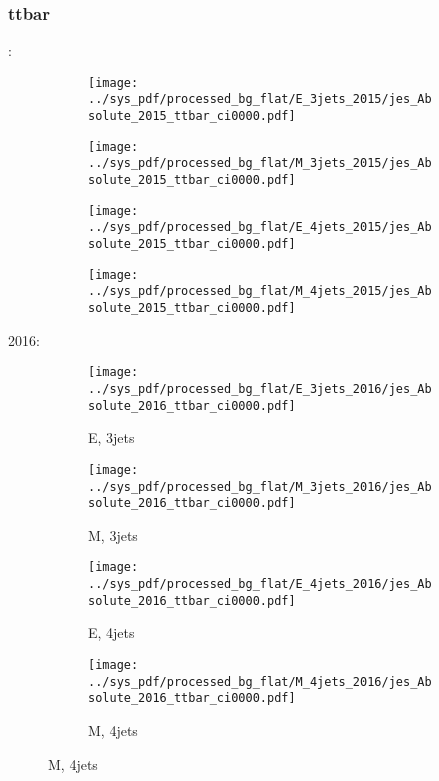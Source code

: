 \documentclass{beamer}
\begin{document}
\begin{frame}
\frametitle{ttbar}
\fontsize{5}{1}:
\begin{figure}
\centering
\begin{subfigure}[b]{0.24\textwidth}
\texttt{[image: ../sys\_pdf/processed\_bg\_flat/E\_3jets\_2015/jes\_Absolute\_2015\_ttbar\_ci0000.pdf]}
\end{subfigure}
\begin{subfigure}[b]{0.24\textwidth}
\texttt{[image: ../sys\_pdf/processed\_bg\_flat/M\_3jets\_2015/jes\_Absolute\_2015\_ttbar\_ci0000.pdf]}
\end{subfigure}
\begin{subfigure}[b]{0.24\textwidth}
\texttt{[image: ../sys\_pdf/processed\_bg\_flat/E\_4jets\_2015/jes\_Absolute\_2015\_ttbar\_ci0000.pdf]}
\end{subfigure}
\begin{subfigure}[b]{0.24\textwidth}
\texttt{[image: ../sys\_pdf/processed\_bg\_flat/M\_4jets\_2015/jes\_Absolute\_2015\_ttbar\_ci0000.pdf]}
\end{subfigure}
\end{figure}
2016:
\begin{figure}
\centering
\begin{subfigure}[b]{0.24\textwidth}
\texttt{[image: ../sys\_pdf/processed\_bg\_flat/E\_3jets\_2016/jes\_Absolute\_2016\_ttbar\_ci0000.pdf]}
\captionsetup{font=tiny}
\caption{E, 3jets}
\end{subfigure}
\begin{subfigure}[b]{0.24\textwidth}
\texttt{[image: ../sys\_pdf/processed\_bg\_flat/M\_3jets\_2016/jes\_Absolute\_2016\_ttbar\_ci0000.pdf]}
\captionsetup{font=tiny}
\caption{M, 3jets}
\end{subfigure}
\begin{subfigure}[b]{0.24\textwidth}
\texttt{[image: ../sys\_pdf/processed\_bg\_flat/E\_4jets\_2016/jes\_Absolute\_2016\_ttbar\_ci0000.pdf]}
\captionsetup{font=tiny}
\caption{E, 4jets}
\end{subfigure}
\begin{subfigure}[b]{0.24\textwidth}
\texttt{[image: ../sys\_pdf/processed\_bg\_flat/M\_4jets\_2016/jes\_Absolute\_2016\_ttbar\_ci0000.pdf]}
\captionsetup{font=tiny}
\caption{M, 4jets}
\end{subfigure}
\end{figure}
\end{frame}
\end{document}

